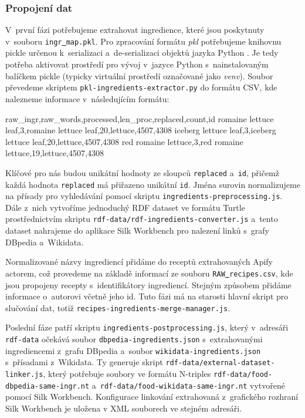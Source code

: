 \subsubsection{Propojení dat}

V~první fázi potřebujeme extrahovat ingredience, které jsou poskytnuty v~souboru \texttt{ingr\underline{{ }}map.pkl}. Pro zpracování formátu \emph{pkl} potřebujeme knihovnu pickle určenou k~serializaci a~de-serializaci objektů jazyka Python \citep{pickle}. Je tedy potřeba aktivovat prostředí pro vývoj v~jazyce Python s~nainstalovaným balíčkem pickle (typicky virtuální prostředí označované jako \emph{venv}). Soubor převedeme skriptem \texttt{pkl-ingredients-extractor.py} do formátu CSV, kde nalezneme informace v~následujícím formátu:

\begin{code}
raw_ingr,raw_words,processed,len_proc,replaced,count,id
romaine lettuce leaf,3,romaine lettuce leaf,20,lettuce,4507,4308
iceberg lettuce leaf,3,iceberg lettuce leaf,20,lettuce,4507,4308
red romaine lettuce,3,red romaine lettuce,19,lettuce,4507,4308
\end{code}

Klíčové pro nás budou unikátní hodnoty ze sloupců \texttt{replaced} a~\texttt{id}, přičemž každá hodnota \texttt{replaced} má přiřazeno unikátní \texttt{id}. Jména surovin normalizujeme na přísady pro vyhledávání pomocí skriptu \texttt{ingredients-preprocessing.js}. Dále z~nich vytvoříme jednoduchý RDF dataset ve formátu Turtle prostřednictvím skriptu \texttt{rdf-data/rdf-ingredients-converter.js} a~tento dataset nahrajeme do aplikace Silk Workbench pro nalezení linků s~grafy DBpedia a~Wikidata.

Normalizované názvy ingrediencí přidáme do receptů extrahovaných Apify actorem, což provedeme na základě informací ze souboru \texttt{RAW\underline{{ }}recipes.csv}, kde jsou propojeny recepty s~identifikátory ingrediencí. Stejným způsobem přidáme informace o~autorovi včetně jeho id. Tuto fázi má na starosti hlavní skript pro slučování dat, totiž \texttt{recipes-ingredients-merge-manager.js}.

Poslední fáze patří skriptu \texttt{ingredients-postprocessing.js}, který v~adresáři \texttt{rdf-data} očekává soubor \texttt{dbpedia-ingredients.json} s~extrahovanými ingrediencemi z~grafu DBpedia a~soubor \texttt{wikidata-ingredients.json} s~přísadami z~Wikidata. Ty generuje skript \texttt{rdf-data/external-dataset-linker.js}, který potřebuje soubory ve formátu N-triples \texttt{rdf-data/food-dbpedia-same-ingr.nt} a~\texttt{rdf-data/food-wikidata-same-ingr.nt} vytvořené pomocí Silk Workbench. Konfigurace linkování extrahovaná z~grafického rozhraní Silk Workbench je uložena v XML souborech ve stejném adresáři.

